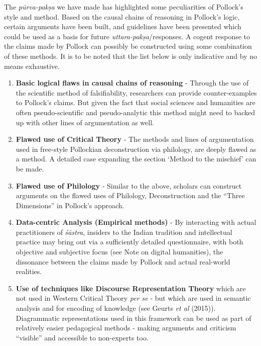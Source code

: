 The {\sl pūrva-pakṣa} we have made has highlighted some peculiarities of Pollock's style and method. Based on the causal chains of reasoning in Pollock's logic, certain arguments have been built, and guidelines have been presented which could be used as a basis for future {\sl uttara-pakṣa}/responses. A cogent response to the claims made by Pollock can possibly be constructed using some combination of these methods. It is to be noted that the list below is only indicative and by no means exhaustive.
\begin{enumerate}
\item {\bf Basic logical flaws in causal chains of reasoning} - Through the use of the scientific method of falsifiability, researchers can provide counter-examples to Pollock's claims.  But given the fact that social sciences and humanities are often pseudo-scientific and pseudo-analytic this method might need to backed up with other lines of argumentation as well.

\item {\bf Flawed use of Critical Theory} - The methods and lines of argumentation used in free-style Pollockian deconstruction via philology, are deeply flawed as a method. A detailed case expanding the section `Method to the mischief' can be made. 

\item {\bf Flawed use of Philology} - Similar to the above, scholars can construct arguments on the flawed uses of Philology, Deconstruction and the ``Three Dimensions'' in Pollock's approach.

\item {\bf Data-centric Analysis (Empirical methods)} - By interacting with actual practitioners of {\sl śāstra}, insiders to the Indian tradition and intellectual practice may bring out via a sufficiently detailed questionnaire, with both objective and subjective focus (see Note on digital humanities), the dissonance between the claims made by Pollock and  actual real-world realities.

\item {\bf Use of techniques like Discourse Representation Theory} which are not used in Western Critical Theory {\sl per se} - but which are used in semantic analysis and for encoding of knowledge (see Geurts {\sl et al} (2015)). Diagrammatic representations used in this framework can be used as part of relatively easier pedagogical methods - making arguments and criticism ``visible'' and accessible to non-experts too.


\end{enumerate}
